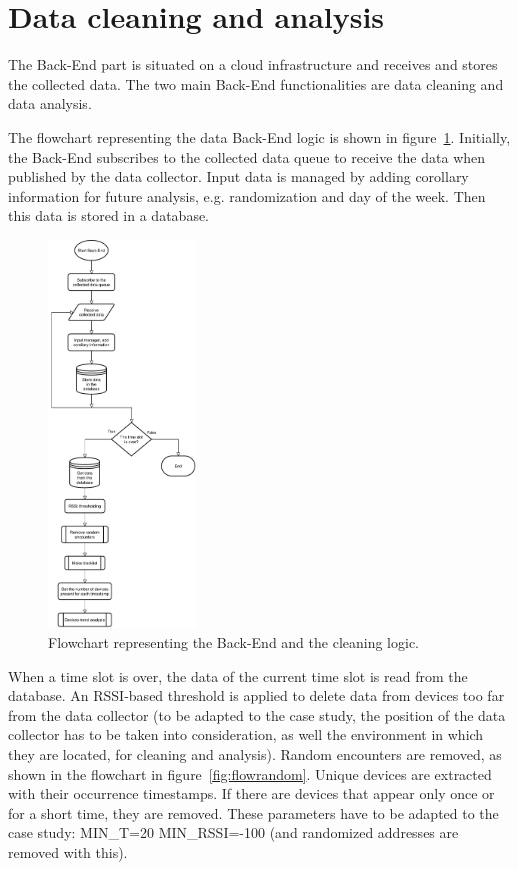 \section{Data cleaning and analysis}
\label{sec:analysis}
\vspace{0.2 cm} 

The Back-End part is situated on a cloud infrastructure and receives and stores the collected data. The two main Back-End functionalities are data cleaning and data analysis.

The flowchart representing the data Back-End logic is shown in figure~\ref{fig:flowcleaner}. Initially, the Back-End subscribes to the collected data queue to receive the data when published by the data collector. Input data is managed by adding corollary information for future analysis, e.g. randomization and day of the week. Then this data is stored in a database.

\begin{figure}[h]
\centering 
\includegraphics[width=0.35\textwidth]{images/flowcleaner} 
\caption{Flowchart representing the Back-End and the cleaning logic.}
\label{fig:flowcleaner}
\end{figure}

When a time slot is over, the data of the current time slot is read from the database. An RSSI-based threshold is applied to delete data from devices too far from the data collector (to be adapted to the case study, the position of the data collector has to be taken into consideration, as well the environment in which they are located, for cleaning and analysis). Random encounters are removed, as shown in the flowchart in figure~\ref{fig:flowrandom}. Unique devices are extracted with their occurrence timestamps. If there are devices that appear only once or for a short time, they are removed. These parameters have to be adapted to the case study: MIN\_T=20 MIN\_RSSI=-100 (and randomized addresses are removed with this).

